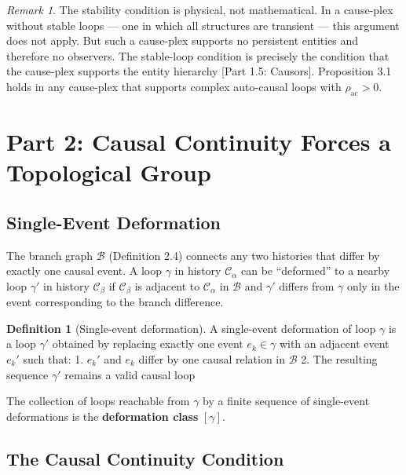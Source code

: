 \documentclass[11pt]{article}
\theoremstyle{definition}
\newtheorem{definition}[theorem]{Definition}
\theoremstyle{remark}
\newtheorem{remark}[theorem]{Remark}
\begin{document}
\begin{remark}
\label{remark:3-4}
The stability condition is physical, not mathematical. In a cause-plex without stable loops — one in which all structures are transient — this argument does not apply. But such a cause-plex supports no persistent entities and therefore no observers. The stable-loop condition is precisely the condition that the cause-plex supports the entity hierarchy [Part 1.5: Causors]. Proposition 3.1 holds in any cause-plex that supports complex auto-causal loops with $\rho_{\mathrm{ac}} > 0$.
\end{remark}

\medskip

\section{Part 2: Causal Continuity Forces a Topological
Group}\label{part-2-causal-continuity-forces-a-topological-group}

\subsection{Single-Event Deformation}\label{single-event-deformation}

The branch graph \(\mathcal{B}\) (Definition 2.4) connects any two
histories that differ by exactly one causal event. A loop \(\gamma\) in
history \(\mathcal{C}_\alpha\) can be ``deformed'' to a nearby loop
\(\gamma'\) in history \(\mathcal{C}_\beta\) if \(\mathcal{C}_\beta\) is
adjacent to \(\mathcal{C}_\alpha\) in \(\mathcal{B}\) and \(\gamma'\)
differs from \(\gamma\) only in the event corresponding to the branch
difference.

\begin{definition}[Single-event deformation]
\label{definition:4-1}
A single-event deformation of loop $\gamma$ is a loop $\gamma'$ obtained by replacing exactly one event $e_k \in \gamma$ with an adjacent event $e_k'$ such that:
1. $e_k'$ and $e_k$ differ by one causal relation in $\mathcal{B}$
2. The resulting sequence $\gamma'$ remains a valid causal loop
\end{definition}

The collection of loops reachable from \(\gamma\) by a finite sequence
of single-event deformations is the \textbf{deformation class}
\([\gamma]\).

\subsection{The Causal Continuity
Condition}\label{the-causal-continuity-condition}
\end{document}

